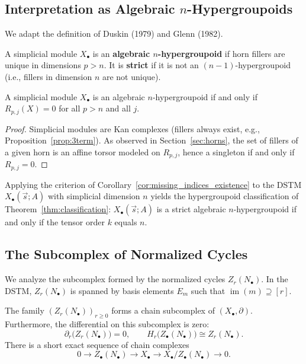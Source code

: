 \subsection{Interpretation as Algebraic \texorpdfstring{$n$}{n}-Hypergroupoids}

We adapt the definition of Duskin (1979) and Glenn (1982).

\begin{definition}
A simplicial module $X_\bullet$ is an \textbf{algebraic $n$-hypergroupoid} if horn fillers are unique in dimensions $p>n$. It is \textbf{strict} if it is not an $(n-1)$-hypergroupoid (i.e., fillers in dimension $n$ are not unique).
\end{definition}

\begin{proposition}
A simplicial module $X_\bullet$ is an algebraic $n$-hypergroupoid if and only if $R_{p,j}(X)=0$ for all $p>n$ and all $j$.
\end{proposition}
\begin{proof}
Simplicial modules are Kan complexes (fillers always exist, e.g., Proposition~\ref{prop:3term}). As observed in Section~\ref{sec:horns}, the set of fillers of a given horn is an affine torsor modeled on $R_{p,j}$, hence a singleton if and only if $R_{p,j}=0$.
\end{proof}

Applying the criterion of Corollary~\ref{cor:missing_indices_existence} to the DSTM
$X_\bullet(\vec s;A)$ with simplicial dimension $n$ yields the hypergroupoid
classification of Theorem~\ref{thm:classification}: $X_\bullet(\vec s;A)$ is a strict
algebraic $n$-hypergroupoid if and only if the tensor order $k$ equals $n$.

\subsection{The Subcomplex of Normalized Cycles}

We analyze the subcomplex formed by the normalized cycles $Z_r(N_\bullet)$.
In the DSTM, $Z_r(N_\bullet)$ is spanned by basis elements $E_m$ such that $\operatorname{im}(m) \supseteq [r]$.

\begin{lemma}\label{lem:normalized-cycle-subcomplex}
The family $(Z_r(N_\bullet))_{r\ge 0}$ forms a chain subcomplex of $(X_\bullet, \partial)$. Furthermore, the differential on this subcomplex is zero:
\[
\partial_r\bigl(Z_r(N_\bullet)\bigr)=0,\qquad
H_r\!\bigl(Z_\bullet(N_\bullet)\bigr)\cong Z_r(N_\bullet).
\]
There is a short exact sequence of chain complexes
\begin{equation}\label{eq:short-exact}
0\longrightarrow Z_\bullet(N_\bullet) \longrightarrow X_\bullet \longrightarrow X_\bullet/Z_\bullet(N_\bullet) \longrightarrow 0.
\end{equation}
\end{lemma}

